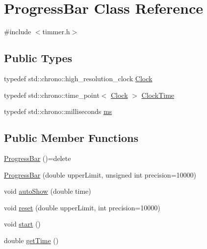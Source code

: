 \hypertarget{class_progress_bar}{}\section{Progress\+Bar Class Reference}
\label{class_progress_bar}


{\ttfamily \#include $<$timmer.\+h$>$}

\subsection*{Public Types}
\begin{DoxyCompactItemize}
\item 
typedef std\+::chrono\+::high\+\_\+resolution\+\_\+clock \mbox{\hyperlink{class_progress_bar_a97494459f2f389b8d0acc95c3a5f25f2}{Clock}}
\item 
typedef std\+::chrono\+::time\+\_\+point$<$ \mbox{\hyperlink{class_progress_bar_a97494459f2f389b8d0acc95c3a5f25f2}{Clock}} $>$ \mbox{\hyperlink{class_progress_bar_a6eb286aadc031d8e34de2a0193c490fa}{Clock\+Time}}
\item 
typedef std\+::chrono\+::milliseconds \mbox{\hyperlink{class_progress_bar_a72afdba302062f07d2720ebfd510d7e2}{ms}}
\end{DoxyCompactItemize}
\subsection*{Public Member Functions}
\begin{DoxyCompactItemize}
\item 
\mbox{\hyperlink{class_progress_bar_a38a019ce3e526ef355433232c389b171}{Progress\+Bar}} ()=delete
\item 
\mbox{\hyperlink{class_progress_bar_a5270a8af4a346e459736ea540b01ac85}{Progress\+Bar}} (double upper\+Limit, unsigned int precision=10000)
\item 
void \mbox{\hyperlink{class_progress_bar_abcd6f66c18eb0dca5fa42ebfff03a11e}{auto\+Show}} (double time)
\item 
void \mbox{\hyperlink{class_progress_bar_ac071fa5489c8a86ab174d150dfe1f195}{reset}} (double upper\+Limit, int precision=10000)
\item 
void \mbox{\hyperlink{class_progress_bar_a25637ac030839b0ea50cfbb91b129359}{start}} ()
\item 
double \mbox{\hyperlink{class_progress_bar_abcca17e287cdae4b0752e3c7a6428d91}{get\+Time}} ()
\end{DoxyCompactItemize}


